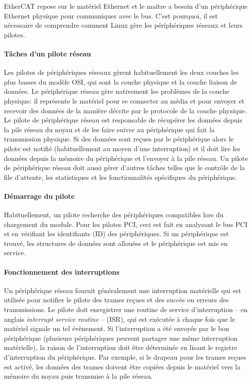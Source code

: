 \documentclass[a4paper,12pt,BCOR6mm,bibtotoc,idxtotoc]{scrbook}
\begin{document}
EtherCAT repose sur le mat\'eriel Ethernet et le ma\^itre a besoin d'un
p\'eriph\'erique Ethernet physique pour communiquer avec le bus.
C'est pourquoi, il est n\'ecessaire de comprendre comment Linux g\`ere
les p\'eriph\'eriques r\'eseaux et leurs pilotes.

\paragraph{T\^aches d'un pilote r\'eseau}
Les pilotes de p\'eriph\'eriques r\'eseaux g\`erent habituellement les
deux couches les plus basses du mod\`ele OSI, qui sont la couche
physique et la couche liaison de donn\'ees.  Le p\'eriph\'erique
r\'eseau g\`ere nativement les probl\`emes de la couche physique: il
repr\'esente le mat\'eriel pour se connecter au m\'edia et pour
envoyer et recevoir des donn\'ees de la mani\`ere d\'ecrite par le
protocole de la couche physique.  Le pilote de p\'eriph\'erique
r\'eseau est responsable de r\'ecup\'erer les donn\'ees depuis la pile
r\'eseau du noyau et de les faire suivre au p\'eriph\'erique qui fait
la transmission physique.  Si des donn\'ees sont re\c{c}ues par le
p\'eriph\'erique alors le pilote est notifi\'e (habituellement au moyen
d'une interruption) et il doit lire les donn\'ees depuis la m\'emoire
du p\'eriph\'erique et l'envoyer \`a la pile r\'eseau.  Un pilote de
p\'eriph\'erique r\'eseau doit aussi g\'erer d'autres t\^aches telles
que le contr\^ole de la file d'attente, les statistiques et les
fonctionnalit\'es sp\'ecifiques du p\'eriph\'erique.

\paragraph{D\'emarrage du pilote} Habituellement, un pilote recherche
des p\'eriph\'eriques compatibles lors du chargement du module.  Pour
les pilotes PCI, ceci est fait en analysant le bus PCI et en
v\'erifiant les identifiants (ID) des p\'eriph\'eriques.  Si un
p\'eriph\'erique est trouv\'e, les structures de donn\'ees sont
allou\'ees et le p\'eriph\'erique est mis en service.

\paragraph{Fonctionnement des interruptions} Un
p\'eriph\'erique r\'eseau fournit g\'en\'eralement une interruption
mat\'erielle qui est utilis\'ee pour notifier le pilote des trames
re\c{c}ues et des succ\`es ou erreurs des transmissions. Le pilote
doit enregistrer une routine de service d'interruption -- en anglais
\textit{interrupt service routine} --
(ISR), qui est
ex\'ecut\'ee \`a chaque fois que le mat\'eriel signale un tel
\'ev\`enement.  Si l'interruption a \'et\'e envoy\'ee par le bon
p\'eriph\'erique (plusieurs p\'eriph\'eriques peuvent partager une
m\^eme interruption mat\'erielle), la raison de l'interruption doit
\^etre d\'etermin\'ee en lisant le registre d'interruption du
p\'eriph\'erique.  Par exemple, si le drapeau pour les trames
re\c{c}ues est activ\'e, les donn\'ees des trames doivent \^etre
copi\'ees depuis le mat\'eriel vers la m\'emoire du noyau puis
transmise \`a la pile r\'eseau.
\end{document}
